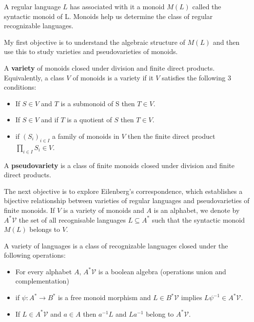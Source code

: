 A regular language $L$ has associated with it a monoid $M(L)$ called the syntactic monoid of L\cite{Gould2021}.
Monoids help us determine the class of regular recognizable languages.

My first objective is to understand the algebraic structure of $M(L)$ and then use this to study varieties and pseudovarieties of monoids.

\begin{definition*} \cite{PinBook}
    A {\bf variety} of monoids closed under division and finite direct products.
    Equivalently, a class $V$ of monoids is a variety if it $V$ satisfies the following 3 conditions:
    \begin{itemize}
        \item If $S \in V$ and $T$ is a submonoid of S then $T \in V$.
        \item If $S \in V$ and if $T$ is a quotient of $S$ then $T \in V$.
        \item if $(S_{i})_{i \in I}$ a family of monoids in $V$ then the finite direct product $\prod_{i \in I} S_i \in V$.
    \end{itemize}
\end{definition*}

A {\bf pseudovariety} is a class of finite monoids closed under division and finite direct products.

The next objective is to explore Eilenberg's correspondence, which establishes a bijective relationship between varieties of regular languages and pseudovarieties of finite monoids. \cite{PinBook}
If $V$ is a variety of monoids and $A$ is an alphabet, we denote by $A^*\mathcal{V}$ the set of all recognisable languages $L \subseteq A^*$ such that the syntactic monoid $M(L)$ belongs to $V$.
\begin{definition*}
    A variety of languages is a class of recognizable languages closed under the following operations:
    \begin{itemize}
        \item For every alphabet $A$, $A^*\mathcal{V}$ is a boolean algebra (operations union and complementation)
        \item if $\psi: A^* \rightarrow B^*$ is a free monoid morphism and $L \in B^*\mathcal{V}$ implies $L\psi^{-1} \in A^*\mathcal{V}$.
        \item If $L \in A^*\mathcal{V}$ and $a \in A$ then $a^{-1}L$ and $La^{-1}$ belong to $A^*\mathcal{V}$.
    \end{itemize}
\end{definition*}

